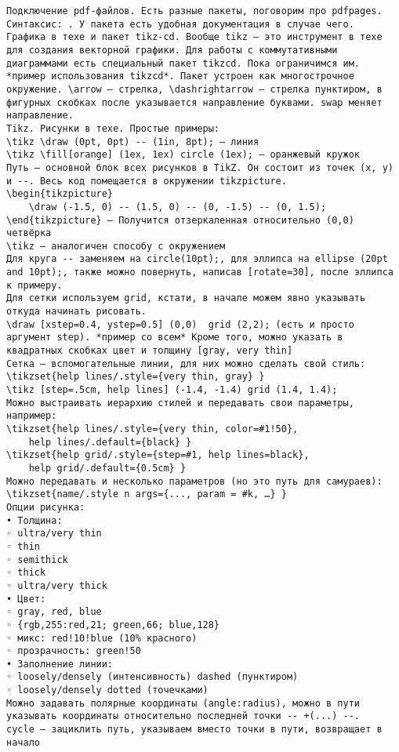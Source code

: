\documentclass[a4paper, 12pt]{article}
\begin{document}
\begin{verbatim}
Подключение pdf-файлов. Есть разные пакеты, поговорим про pdfpages. Синтаксис: . У пакета есть удобная документация в случае чего.
Графика в техе и пакет tikz-cd. Вообще tikz – это инструмент в техе для создания векторной графики. Для работы с коммутативными диаграммами есть специальный пакет tikzcd. Пока ограничимся им. *пример использования tikzcd*. Пакет устроен как многострочное окружение. \arrow – стрелка, \dashrightarrow – стрелка пунктиром, в фигурных скобках после указывается направление буквами. swap меняет направление.
Tikz. Рисунки в техе. Простые примеры: 
\tikz \draw (0pt, 0pt) -- (1in, 8pt); – линия
\tikz \fill[orange] (1ex, 1ex) circle (1ex); – оранжевый кружок
Путь – основной блок всех рисунков в TikZ. Он состоит из точек (x, y) и --. Весь код помещается в окружении tikzpicture.
\begin{tikzpicture}
	\draw (-1.5, 0) -- (1.5, 0) -- (0, -1.5) -- (0, 1.5);
\end{tikzpicture} – Получится отзеркаленная относительно (0,0) четвёрка
\tikz – аналогичен способу с окружением
Для круга -- заменяем на circle(10pt);, для эллипса на ellipse (20pt and 10pt);, также можно повернуть, написав [rotate=30], после эллипса к примеру.
Для сетки используем grid, кстати, в начале можем явно указывать откуда начинать рисовать. 
\draw [xstep=0.4, ystep=0.5] (0,0)  grid (2,2); (есть и просто аргумент step). *пример со всем* Кроме того, можно указать в квадратных скобках цвет и толщину [gray, very thin]
Сетка – вспомогательные линии, для них можно сделать свой стиль:
\tikzset{help lines/.style={very thin, gray} }
\tikz [step=.5cm, help lines] (-1.4, -1.4) grid (1.4, 1.4);
Можно выстраивать иерархию стилей и передавать свои параметры, например:
\tikzset{help lines/.style={very thin, color=#1!50},
	help lines/.default={black} }
\tikzset{help grid/.style={step=#1, help lines=black},
	help grid/.default={0.5cm} }
Можно передавать и несколько параметров (но это путь для самураев): \tikzset{name/.style n args={..., param = #k, …} }
Опции рисунка:
• Толщина:
◦ ultra/very thin
◦ thin
◦ semithick
◦ thick
◦ ultra/very thick
• Цвет:
◦ gray, red, blue
◦ {rgb,255:red,21; green,66; blue,128}
◦ микс: red!10!blue (10% красного)
◦ прозрачность: green!50
• Заполнение линии:
◦ loosely/densely (интенсивность) dashed (пунктиром)
◦ loosely/densely dotted (точечками)
Можно задавать полярные координаты (angle:radius), можно в пути указывать координаты относительно последней точки -- +(...) --.
cycle – зациклить путь, указываем вместо точки в пути, возвращает в начало

\end{verbatim}
\end{document}
